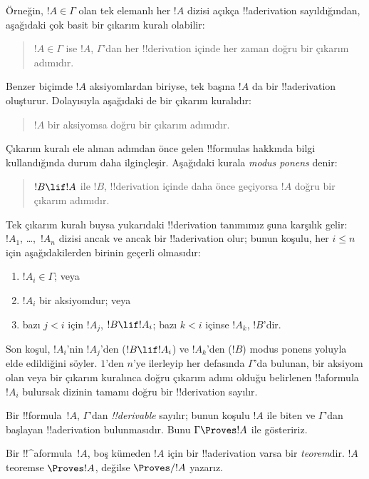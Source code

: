 \documentclass[../../../include/open-logic-section]{subfiles}
\begin{document}
Örneğin, $!A \in \Gamma$ olan tek elemanlı her $!A$ dizisi açıkça
!!a{derivation} sayıldığından, aşağıdaki çok basit bir çıkarım kuralı olabilir:
\begin{quote}
  $!A \in \Gamma$ ise $!A$, $\Gamma$'dan her !!{derivation} içinde her zaman
  doğru bir çıkarım adımıdır.
\end{quote}
Benzer biçimde $!A$ aksiyomlardan biriyse, tek başına $!A$ da bir
!!a{derivation} oluşturur. Dolayısıyla aşağıdaki de bir çıkarım kuralıdır:
\begin{quote}
  $!A$ bir aksiyomsa doğru bir çıkarım adımıdır.
\end{quote}
Çıkarım kuralı ele alınan adımdan önce gelen !!{formula}s hakkında bilgi kullandığında
durum daha ilginçleşir. Aşağıdaki kurala \emph{modus ponens} denir:
\begin{quote}
  $!B \lif !A$ ile $!B$, !!{derivation} içinde daha önce geçiyorsa $!A$ doğru
  bir çıkarım adımıdır.
\end{quote}
Tek çıkarım kuralı buysa yukarıdaki !!{derivation} tanımımız şuna karşılık
gelir: $!A_1$, \dots,~$!A_n$ dizisi ancak ve ancak bir !!a{derivation} olur;
bunun koşulu, her $i \le n$ için aşağıdakilerden birinin geçerli olmasıdır:
\begin{enumerate}
\item $!A_i \in \Gamma$; veya
\item $!A_i$ bir aksiyomdur; veya
\item bazı $j < i$ için $!A_j$, $!B \lif !A_i$; bazı $k < i$ içinse $!A_k$,
  $!B$'dir.
\end{enumerate}
Son koşul, $!A_i$'nin $!A_j$'den ($!B \lif !A_i$) ve $!A_k$'den ($!B$)
modus ponens yoluyla elde edildiğini söyler. $1$'den $n$'ye ilerleyip her
defasında $\Gamma$'da bulunan, bir aksiyom olan veya bir çıkarım kuralınca
doğru çıkarım adımı olduğu belirlenen !!a{formula}~$!A_i$ bulursak dizinin
tamamı doğru bir !!{derivation} sayılır.

\begin{defn}[!!^{derivability}]
Bir !!{formula}~$!A$, $\Gamma$'dan \emph{!!{derivable}} sayılır; bunun koşulu
$!A$ ile biten ve $\Gamma$'dan başlayan !!a{derivation} bulunmasıdır. Bunu
$\Gamma \Proves !A$ ile gösteririz.
\end{defn}

\begin{defn}[Teoremler]
Bir !!^a{formula}~$!A$, boş kümeden $!A$ için bir !!a{derivation} varsa bir
\emph{teorem}dir. $!A$ teoremse $\Proves !A$, değilse $\Proves/ !A$ yazarız.
\end{defn}
\end{document}

